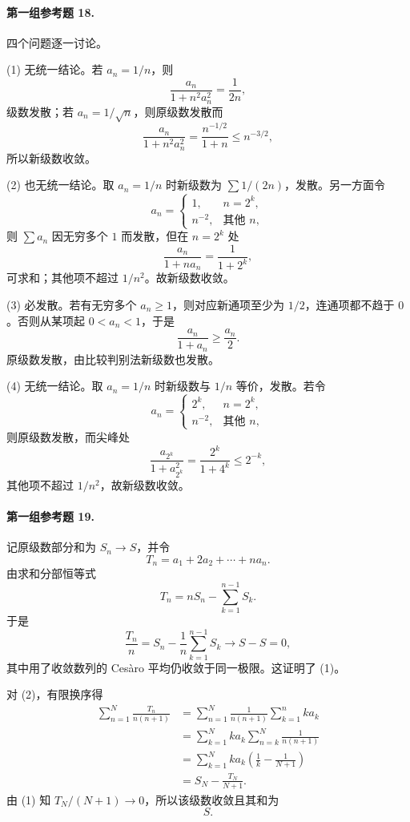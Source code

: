 \paragraph{第一组参考题 18.}
\begin{xsolution}
四个问题逐一讨论。

(1) 无统一结论。若 $a_n=1/n$，则
\[
 \frac{a_n}{1+n^2a_n^2}=\frac1{2n},
\]
级数发散；若 $a_n=1/\sqrt n$，则原级数发散而
\[
 \frac{a_n}{1+n^2a_n^2}
 =\frac{n^{-1/2}}{1+n}\leq n^{-3/2},
\]
所以新级数收敛。

(2) 也无统一结论。取 $a_n=1/n$ 时新级数为 $\sum1/(2n)$，发散。另一方面令
\[
 a_n=\begin{cases}
 1,&n=2^k,\\
 n^{-2},&\text{其他 }n,
 \end{cases}
\]
则 $\sum a_n$ 因无穷多个 $1$ 而发散，但在 $n=2^k$ 处
\[
 \frac{a_n}{1+na_n}=\frac1{1+2^k},
\]
可求和；其他项不超过 $1/n^2$。故新级数收敛。

(3) 必发散。若有无穷多个 $a_n\geq1$，则对应新通项至少为 $1/2$，连通项都不趋于 $0$。否则从某项起 $0<a_n<1$，于是
\[
 \frac{a_n}{1+a_n}\geq\frac{a_n}{2}.
\]
原级数发散，由比较判别法新级数也发散。

(4) 无统一结论。取 $a_n=1/n$ 时新级数与 $1/n$ 等价，发散。若令
\[
 a_n=\begin{cases}
 2^k,&n=2^k,\\
 n^{-2},&\text{其他 }n,
 \end{cases}
\]
则原级数发散，而尖峰处
\[
 \frac{a_{2^k}}{1+a_{2^k}^2}
 =\frac{2^k}{1+4^k}\leq2^{-k},
\]
其他项不超过 $1/n^2$，故新级数收敛。
\end{xsolution}

\paragraph{第一组参考题 19.}
\begin{xsolution}
记原级数部分和为 $S_n\to S$，并令
\[
 T_n=a_1+2a_2+\cdots+na_n.
\]
由求和分部恒等式
\[
 T_n=nS_n-\sum_{k=1}^{n-1}S_k.
\]
于是
\[
 \frac{T_n}{n}
 =S_n-\frac1n\sum_{k=1}^{n-1}S_k\longrightarrow S-S=0,
\]
其中用了收敛数列的 Cesàro 平均仍收敛于同一极限。这证明了 (1)。

对 (2)，有限换序得
\[
 \begin{aligned}
 \sum_{n=1}^{N}\frac{T_n}{n(n+1)}
 &=\sum_{n=1}^{N}\frac1{n(n+1)}\sum_{k=1}^{n}ka_k\\
 &=\sum_{k=1}^{N}ka_k\sum_{n=k}^{N}\frac1{n(n+1)}\\
 &=\sum_{k=1}^{N}ka_k\left(\frac1k-\frac1{N+1}\right)\\
 &=S_N-\frac{T_N}{N+1}.
\end{aligned}
\]
由 (1) 知 $T_N/(N+1)\to0$，所以该级数收敛且其和为
\[
 \boxed{S}.
\]
\end{xsolution}

